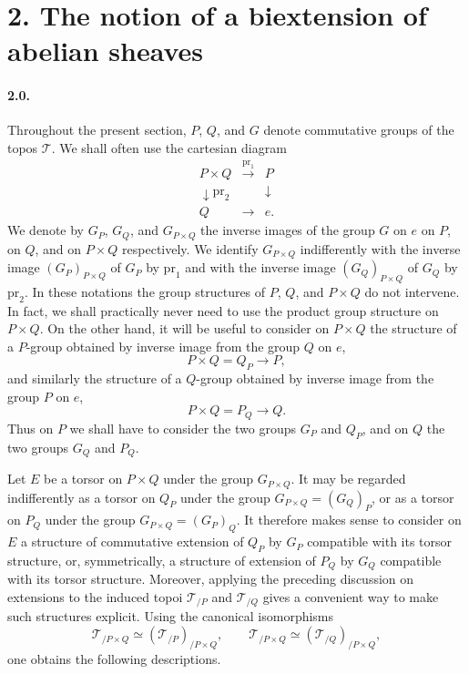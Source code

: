 \documentclass[11pt]{article}
\theoremstyle{plain}
\theoremstyle{definition}
\theoremstyle{remark}
\begin{document}
\section*{2. The notion of a biextension of abelian sheaves}

\paragraph{2.0.} Throughout the present section, $P$, $Q$, and $G$ denote commutative groups of the topos $\mathcal T$. We shall often use the cartesian diagram
\begin{equation}
\begin{array}{ccc}
P\times Q&\xrightarrow{\mathrm{pr}_1}&P\\
\downarrow{\scriptstyle \mathrm{pr}_2}&&\downarrow\\
Q&\longrightarrow&e.
\end{array}
\tag{2.0.1}
\end{equation}
We denote by $G_P$, $G_Q$, and $G_{P\times Q}$ the inverse images of the group $G$ on $e$ on $P$, on $Q$, and on $P\times Q$ respectively. We identify $G_{P\times Q}$ indifferently with the inverse image $(G_P)_{P\times Q}$ of $G_P$ by $\mathrm{pr}_1$ and with the inverse image $(G_Q)_{P\times Q}$ of $G_Q$ by $\mathrm{pr}_2$. In these notations the group structures of $P$, $Q$, and $P\times Q$ do not intervene. In fact, we shall practically never need to use the product group structure on $P\times Q$. On the other hand, it will be useful to consider on $P\times Q$ the structure of a $P$-group obtained by inverse image from the group $Q$ on $e$,
\begin{equation}
P\times Q=Q_P\longrightarrow P,
\tag{2.0.2}
\end{equation}
and similarly the structure of a $Q$-group obtained by inverse image from the group $P$ on $e$,
\begin{equation}
P\times Q=P_Q\longrightarrow Q.
\tag{2.0.3}
\end{equation}
Thus on $P$ we shall have to consider the two groups $G_P$ and $Q_P$, and on $Q$ the two groups $G_Q$ and $P_Q$.

Let $E$ be a torsor on $P\times Q$ under the group $G_{P\times Q}$. It may be regarded indifferently as a torsor on $Q_P$ under the group $G_{P\times Q}=(G_Q)_P$, or as a torsor on $P_Q$ under the group $G_{P\times Q}=(G_P)_Q$. It therefore makes sense to consider on $E$ a structure of commutative extension of $Q_P$ by $G_P$ compatible with its torsor structure, or, symmetrically, a structure of extension of $P_Q$ by $G_Q$ compatible with its torsor structure. Moreover, applying the preceding discussion on extensions to the induced topoi $\mathcal T_{/P}$ and $\mathcal T_{/Q}$ gives a convenient way to make such structures explicit. Using the canonical isomorphisms
\[
\mathcal T_{/P\times Q}\simeq (\mathcal T_{/P})_{/P\times Q},\qquad
\mathcal T_{/P\times Q}\simeq (\mathcal T_{/Q})_{/P\times Q},
\]
one obtains the following descriptions.
\end{document}
